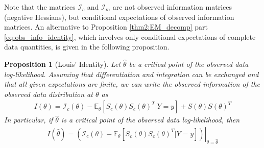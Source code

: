 \documentclass[11pt, oneside]{article}   	%
\newcommand{\bE}{\mathbb{E}}
\newtheorem{proposition}{Proposition}[section]
\begin{document}
Note that the matrices $\mathcal{I}_c$ and $\mathcal{I}_m$ are not observed information matrices (negative Hessians), but conditional expectations of observed information matrices. 
An alternative to Proposition \ref{thm2:EM_decomp} part \ref{eq:obs_info_identity}, which involves only conditional expectations of complete data quantities, is given in the following proposition.

\begin{proposition}[Louis' Identity]
    \label{thm2:info_decomp}
    Let $\hat{\theta}$ be a critical point of the observed data log-likelihood. Assuming that differentiation and integration can be exchanged and that all given expectations are finite, we can write the observed information of the observed data distribution at $\theta$ as
    \begin{align}
        I(\theta) = \mathcal{I}_c(\theta) - \bE_{\theta} [ S_c(\theta) S_c(\theta)^T | Y=y] + S(\theta) S(\theta)^T
    \end{align}
    In particular, if $\hat{\theta}$ is a critical point of the observed data log-likelihood, then
    \begin{align}
        I(\hat{\theta}) = \left. \left(\mathcal{I}_c(\theta)  -  \bE_{\theta} [ S_c(\theta) S_c(\theta)^T | Y=y]\right) \right|_{\theta = \hat{\theta}} \label{eq:info_at_MLE}
    \end{align}
\end{proposition}
\end{document}
